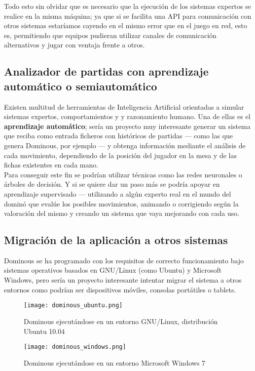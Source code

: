 Todo esto sin olvidar que es necesario que la ejecución de los sistemas expertos se realice en la misma máquina; ya que
si se facilita una API para comunicación con otros sistemas estaríamos cayendo en el mismo error que en el juego en red, 
esto es, permitiendo que equipos pudieran utilizar canales de comunicación alternativos y jugar con ventaja frente a otros.

\subsection{Analizador de partidas con aprendizaje automático o semiautomático}

Existen multitud de herramientas de Inteligencia Artificial orientadas a simular sistemas expertos, comportamientos y 
y razonamiento humano. Una de ellas es el \textbf{aprendizaje automático}; sería un proyecto muy interesante generar un sistema
que reciba como entrada ficheros con históricos de partidas --- como las que genera Dominous, por ejemplo --- y obtenga
información mediante el análisis de cada movimiento, dependiendo de la posición del jugador en la mesa y de las fichas
existentes en cada mano. \\

Para conseguir este fin se podrían utilizar técnicas como las redes neuronales o árboles de decisión. Y si se quiere
dar un paso más se podría apoyar en aprendizaje supervisado --- utilizando a algún experto real en el mundo del dominó
que evalúe los posibles movimientos, animando o corrigiendo según la valoración del mismo y creando un sistema que
vaya mejorando con cada uso.

\subsection{Migración de la aplicación a otros sistemas}

Dominous se ha programado con los requisitos de correcto funcionamiento bajo sistemas operativos basados en GNU/Linux (como
Ubuntu) y Microsoft Windows, pero sería un proyecto interesante intentar migrar el sistema a otros entornos como podrían ser
dispositivos móviles, consolas portátiles o tablets. \\

\begin{figure}[h]
  \label{dominous_ubuntu}
  \begin{center}
    \texttt{[image: dominous\_ubuntu.png]}
  \end{center}
  \caption{Dominous ejecutándose en un entorno GNU/Linux, distribución Ubuntu 10.04}
\end{figure}


\begin{figure}[h]
  \label{dominous_windows}
  \begin{center}
    \texttt{[image: dominous\_windows.png]}
  \end{center}
  \caption{Dominous ejecutándose en un entorno Microsoft Windows 7}
\end{figure}

